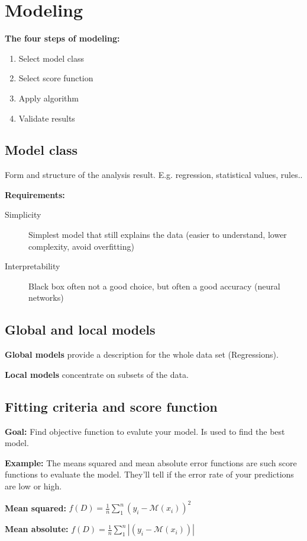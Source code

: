 \documentclass[fleqn, oneside, 10pt, titlepage]{article}
\begin{document}
\section{Modeling}
\textbf{The four steps of modeling:}
\begin{enumerate}
	\item Select model class
	\item Select score function
	\item Apply algorithm
	\item Validate results
\end{enumerate}

\subsection{Model class}
Form and structure of the analysis result. E.g. regression, statistical values, rules..

\textbf{Requirements:}
\begin{description}
	\item[Simplicity] Simplest model that still explains the data (easier to understand, lower complexity, avoid overfitting)
	\item[Interpretability] Black box often not a good choice, but often a good accuracy (neural networks)
\end{description}

\subsection{Global and local models}
\textbf{Global models} provide a description for the whole data set (Regressions).

\textbf{Local models} concentrate on subsets of the data.

\subsection{Fitting criteria and score function}
\textbf{Goal:} Find objective function to evalute your model. Is used to find the best model.

\textbf{Example:} The means squared and mean absolute error functions are such score functions to evaluate the model. They'll tell if the error rate of your predictions are low or high.

\textbf{Mean squared:} $f(D) = \frac{1}{n} \sum_1^n(y_i - \mathcal{M}(x_i))^2$

\textbf{Mean absolute:} $f(D) = \frac{1}{n} \sum_1^n|(y_i - \mathcal{M}(x_i))|$
\end{document}

